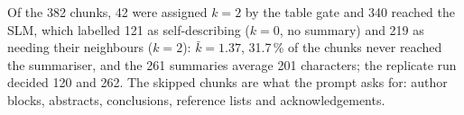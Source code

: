 \documentclass[pdflatex,sn-mathphys-num]{sn-jnl}
\newif\ifprovenance
\newcommand{\verify}[1]{\ifprovenance\textcolor{red}{{\footnotesize [VERIFY: #1]}}\fi}
\theoremstyle{thmstyleone}%
\theoremstyle{thmstylethree}%
\begin{document}
Of the 382 chunks, 42 were assigned $k=2$ by the table gate and 340 reached the SLM, which labelled 121 as self-describing ($k=0$, no summary) and 219 as needing their neighbours ($k=2$): $\bar k=1.37$, 31.7\,\% of the chunks never reached the summariser, and the 261 summaries average 201 characters; the replicate run decided 120 and 262.\verify{radius and tier distribution printed by cell~2 of \texttt{RnD/ablation\_dynamic\_doc\_slice\_generation.ipynb} and the \texttt{doc\_slice\_radius}/\texttt{slice\_tier} fields of \texttt{RnD/preprocessed\_chunks/ablation\_doc\_slice\_radius\_dynamic.json} (0/slm 121, 2/slm 219, 2/table 42); $\bar k=522/382$; $121/382=0.317$; summary length: mean of \texttt{len(context)} over the 261 non-empty records; replicate: \texttt{k\_dist} of \texttt{real\_runs/binary\_t2\_heldout.json}} The skipped chunks are what the prompt asks for: author blocks, abstracts, conclusions, reference lists and acknowledgements.
\end{document}
